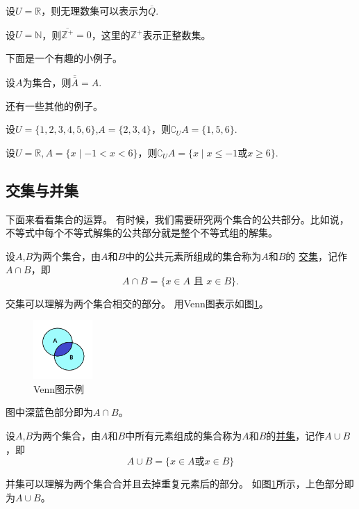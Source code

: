 \documentclass[lang=cn,math=cm,chinesefont=nofont,11pt,scheme=chinese,onecol]{elegantbook}
\begin{document}
\begin{example}
  设$U=\mathbb{R}$，则无理数集可以表示为$\overline{Q}$.
\end{example}

\begin{example}
  设$U=\mathbb{N}$，则$\overline{\mathbb{Z}^+}={0}$，这里的$\mathbb{Z}^+$表示正整数集。
\end{example}

下面是一个有趣的小例子。

\begin{example}
  设$A$为集合，则$\overline{\overline{A}}=A$.
\end{example}

还有一些其他的例子。

\begin{example}
  设$U=\{1,2,3,4,5,6\}$,$A=\{2,3,4\}$，则$\complement_{U}A=\{1,5,6\}.$
\end{example}

\begin{example}
  设$U=\mathbb{R},A=\{x\mid -1<x<6\}$，则$\complement_{U}A=\{x\mid x\leq -1\text{或}x\geq 6\}.$
\end{example}

\subsection{交集与并集}
下面来看看集合的运算。
有时候，我们需要研究两个集合的公共部分。比如说，不等式中每个不等式解集的公共部分就是整个不等式组的解集。
\begin{definition}[交集]
  设$A$,$B$为两个集合，由$A$和$B$中的公共元素所组成的集合称为$A$和$B$的
  \underline{交集}，记作$A\cap B$，即$$A\cap B=\{x\in A\text{ 且 }x\in B\}.$$
\end{definition}
  交集可以理解为两个集合相交的部分。
  用Venn图表示如图\ref{img:Venn2}。
  \begin{figure}[h]
    \centering
    \includegraphics[width=0.2\textwidth]{image/Venn2.png}
    \caption{Venn图示例}
    \label{img:Venn2}
  \end{figure}
  图中深蓝色部分即为$A\cap B$。

\begin{definition}
  设$A$,$B$为两个集合，由$A$和$B$中所有元素组成的集合称为$A$和$B$的\underline{并集}，记作$A\cup B$，即
  $$A\cup B=\{x\in A\text{或}x\in B\}$$
\end{definition}
  并集可以理解为两个集合合并且去掉重复元素后的部分。
  如图\ref{img:Venn2}所示，上色部分即为$A\cup B$。 
\end{document}

